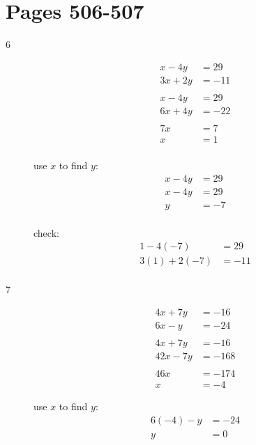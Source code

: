 \documentclass[fleqn,addpoints]{exam}
\begin{document}
\section{Pages 506-507}
\begin{description}

\item[6]
\begin{align*}
  x-4y &= 29 \\
  3x+2y &= -11 \\    
  \\
  x-4y &= 29 \\
  6x+4y &= -22 \\
  \\
  7x &= 7 \\
  x &= 1 \\
\end{align*}

use $x$ to find $y$:
\begin{align*}
  x-4y &= 29 \\
  x - 4y &= 29 \\
  y &= -7 \\
\end{align*}

\vspace{0.2 cm}
\vspace{0.2 cm}

check:
\begin{align*}
  1-4(-7) &= 29 \\
  3(1)+2(-7) &= -11 \\    
\end{align*}

\item[7]
\begin{align*}
  4x+7y &= -16 \\
  6x-y &= -24 \\
  \\
  4x+7y &= -16 \\
  42x-7y &= -168 \\
  \\
  46x &= -174 \\
  x &= -4
\end{align*}

use $x$ to find $y$:
\begin{align*}
  6(-4)-y &= -24 \\
  y &= 0 \\
\end{align*}

\vspace{0.2 cm}
\vspace{0.2 cm}


\end{description}
\end{document}
